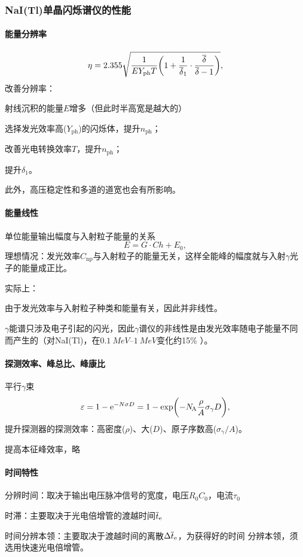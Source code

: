 \subsubsection{NaI(Tl)单晶闪烁谱仪的性能}
\paragraph{能量分辨率}
\[
	\eta=2.355\sqrt{\frac1{EY_{\mathrm{ph}}T}\biggl(1+\frac1{\overline\delta_1}\cdot\frac{\overline\delta}{\overline\delta-1}\biggr)},
\]
改善分辨率：
\begin{compactenum}
	\item 射线沉积的能量$E$增多（但此时半高宽是越大的）
	\item 选择发光效率高($Y_{\mathrm{ph}}$)的闪烁体，提升$n_{\mathrm{ph}}$；
	\item 改善光电转换效率$T$，提升$n_{\mathrm{ph}}$；
	\item 提升$\delta_1$。
\end{compactenum}
此外，高压稳定性和多道的道宽也会有所影响。
\paragraph{能量线性}单位能量输出幅度与入射粒子能量的关系
\[
	E=G\cdot Ch+E_0,
\]
理想情况：发光效率$C_{\mathrm{np}}$与入射粒子的能量无关，这样全能峰的幅度就与入射$\gamma$光子的能量成正比。

实际上：
\begin{compactitem}
	\item 由于发光效率与入射粒子种类和能量有关，因此并非线性。
	\item $\gamma$能谱只涉及电子引起的闪光，因此$\gamma$谱仪的非线性是由发光效率随电子能量不同而产生的（对NaI(Tl)，在$\SIrange{0.1}{1}{MeV}$变化约15\% ）。
\end{compactitem}
\paragraph{探测效率、峰总比、峰康比}平行$\gamma$束
\[
	\varepsilon=1-\mathop{}\!\mathrm{e}^{-N\sigma D}=1-\exp\biggl(-N_{\hspace{-1 pt}\mathrm A}\frac\rho{A}\sigma_\gamma D\biggr),
\]
提升探测器的探测效率：高密度($\rho$)、大($D$)、原子序数高($\sigma_\gamma/A$)。

提高本征峰效率，略
\paragraph{时间特性}
\begin{compactitem}
	\item 分辨时间：取决于输出电压脉冲信号的宽度，电压$R_0C_0$，电流$\tau_0$
	\item 时滞：主要取决于光电倍增管的渡越时间$\overline t_\mathrm e$
	\item 时间分辨本领：主要取决于渡越时间的离散$\Delta\overline t_\mathrm e$，为获得好的时间	分辨本领，须选用快速光电倍增管。
\end{compactitem}
\iffalse
\begin{compactenum}
	\item 
\end{compactenum}
\begin{compactitem}
	\item 
\end{compactitem}
\fi


